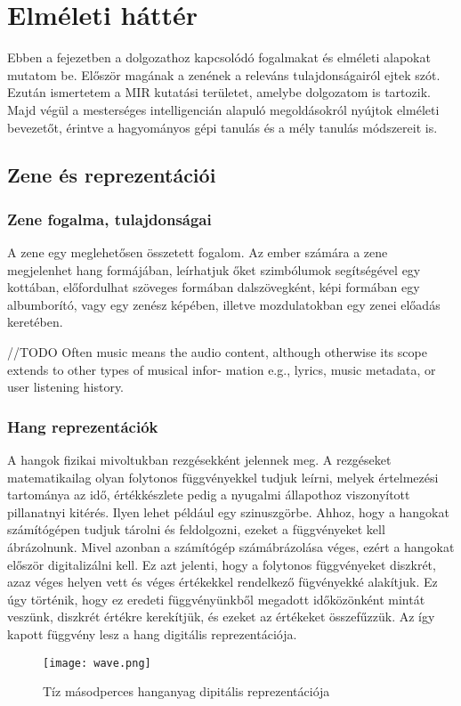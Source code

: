 \chapter{Elméleti háttér} 
\label{ch:theory}

Ebben a fejezetben a dolgozathoz kapcsolódó fogalmakat és elméleti alapokat mutatom be. Először magának a zenének a releváns tulajdonságairól ejtek szót. Ezután ismertetem a MIR kutatási területet, amelybe dolgozatom is tartozik. Majd végül a mesterséges intelligencián alapuló megoldásokról nyújtok elméleti bevezetőt, érintve a hagyományos gépi tanulás és a mély tanulás módszereit is.

\section{Zene és reprezentációi} 

\subsection{Zene fogalma, tulajdonságai}

A zene egy meglehetősen összetett fogalom. Az ember számára a zene megjelenhet hang formájában, leírhatjuk őket szimbólumok segítségével egy kottában, előfordulhat szöveges formában dalszövegként, képi formában egy albumborító, vagy egy zenész képében, illetve mozdulatokban egy zenei előadás keretében. 

//TODO
Often music means the audio content, although otherwise its scope extends to other types of musical infor-
mation e.g., lyrics, music metadata, or user listening history.

\subsection{Hang reprezentációk}

A hangok fizikai mivoltukban rezgésekként jelennek meg. A rezgéseket matematikailag olyan folytonos függvényekkel tudjuk leírni, melyek értelmezési tartománya az idő, értékkészlete pedig a nyugalmi állapothoz viszonyított pillanatnyi kitérés. Ilyen lehet például egy szinuszgörbe. Ahhoz, hogy a hangokat számítógépen tudjuk tárolni és feldolgozni, ezeket a függvényeket kell ábrázolnunk.  Mivel azonban a számítógép számábrázolása véges, ezért a hangokat először digitalizálni kell. Ez azt jelenti, hogy a folytonos függvényeket diszkrét, azaz véges helyen vett és véges értékekkel rendelkező fügvényekké alakítjuk. Ez úgy történik, hogy ez eredeti függvényünkből megadott időközönként mintát veszünk, diszkrét értékre kerekítjük, és ezeket az értékeket összefűzzük. Az így kapott függvény lesz a hang digitális reprezentációja.
\begin{figure}[H]
  \texttt{[image: wave.png]}
  \caption{Tíz másodperces hanganyag dipitális reprezentációja}
\end{figure}

